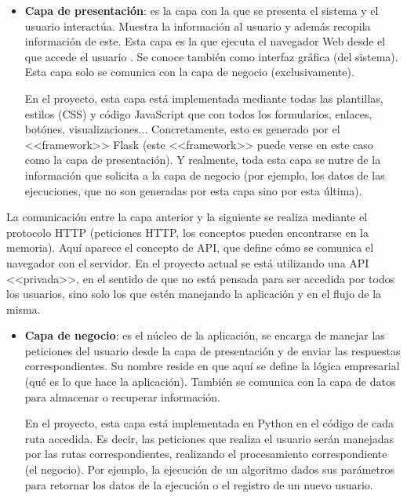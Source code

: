 

\begin{itemize}
    \item \textbf{Capa de presentación}: es la capa con la que se presenta el
    sistema y el usuario interactúa. Muestra la información al usuario y además
    recopila información de este. Esta capa es la que ejecuta el navegador Web
    desde el que accede el usuario \cite{arq3capas:ibm}. Se conoce también como
    interfaz gráfica (del sistema). Esta capa solo se comunica con la capa de
    negocio \cite{eswiki:149121324} (exclusivamente).

    En el proyecto, esta capa está implementada mediante todas las plantillas,
    estilos (CSS) y código JavaScript que con todos los formularios, enlaces,
    botónes, visualizaciones... Concretamente, esto es generado por el
    <<framework>> Flask (este <<framework>> puede verse en este caso como la
    capa de presentación). Y realmente, toda esta capa se nutre de la
    información que solicita a la capa de negocio (por ejemplo, los datos de las
    ejecuciones, que no son generadas por esta capa sino por esta última). 
\end{itemize}

La comunicación entre la capa anterior y la siguiente se realiza mediante el
protocolo HTTP (peticiones HTTP, los conceptos pueden encontrarse en la
memoria). Aquí aparece el concepto de API, que define cómo se comunica el
navegador con el servidor. En el proyecto actual se está utilizando una API
<<privada>>, en el sentido de que no está pensada para ser accedida por todos
los usuarios, sino solo los que estén manejando la aplicación y en el flujo de
la misma. 

\begin{itemize}
    \item \textbf{Capa de negocio}: es el núcleo de la aplicación, se encarga de
    manejar las peticiones del usuario desde la capa de presentación y de enviar
    las respuestas correspondientes. Su nombre reside en que aquí se define la
    lógica empresarial (qué es lo que hace la aplicación). También se comunica
    con la capa de datos para almacenar o recuperar información.

    En el proyecto, esta capa está implementada en Python en el código de cada
    ruta accedida. Es decir, las peticiones que realiza el usuario serán
    manejadas por las rutas correspondientes, realizando el procesamiento
    correspondiente (el negocio). Por ejemplo, la ejecución de un algoritmo
    dados sus parámetros para retornar los datos de la ejecución o el registro
    de un nuevo usuario.
\end{itemize}

